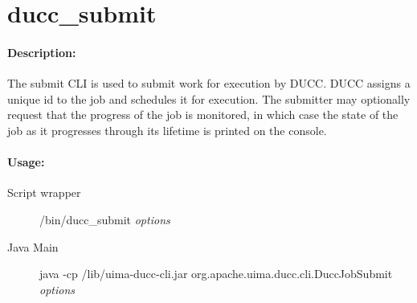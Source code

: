 % 
% 
% 
% 
\ifpdf
\else
{}
\fi

    \section{ducc\_submit}
    \label{sec:cli.ducc-submit}
       \paragraph{Description:}
           The submit CLI is used to submit work for execution by DUCC. DUCC assigns a unique id to the
           job and schedules it for execution. The submitter may optionally request that the progress of
           the job is monitored, in which case the state of the job as it progresses through its
           lifetime is printed on the console.
       \paragraph{Usage:}
           \begin{description}
             \item[Script wrapper] \ducchome/bin/ducc\_submit {\em options}
             \item[Java Main]      java -cp \ducchome/lib/uima-ducc-cli.jar org.apache.uima.ducc.cli.DuccJobSubmit {\em options}
           \end{description}

